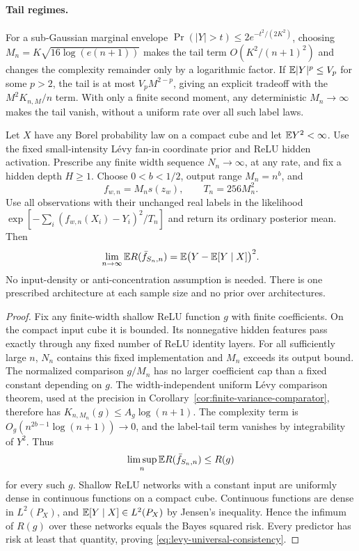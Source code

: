 \paragraph{Tail regimes.}
For a sub-Gaussian marginal envelope
$\Pr(|Y|>t)\le2e^{-t^2/(2K^2)}$, choosing
$M_n=K\sqrt{16\log(e(n+1))}$ makes the tail term
$O(K^2/(n+1)^2)$ and changes the complexity remainder only by a
logarithmic factor. If $\mathbb E|Y|^p\le V_p$ for some $p>2$, the tail is
at most $V_p M^{2-p}$, giving an explicit tradeoff with the
$M^2K_{n,M}/n$ term. With only a finite second moment,
any deterministic $M_n\to\infty$ makes the tail vanish, without a
uniform rate over all such label laws.

\begin{corollary}
\label{cor:levy-universal-consistency}
Let $X$ have any Borel probability law on a compact cube and let
$\mathbb E Y^2<\infty$. Use the fixed small-intensity L\'evy fan-in
coordinate prior and ReLU hidden activation. Prescribe any finite
width sequence $N_n\to\infty$, at any rate, and fix a hidden depth
$H\ge1$. Choose $0<b<1/2$, output range $M_n=n^b$, and
\[
 f_{w,n}=M_n s(z_w),\qquad T_n=256M_n^2.
\]
Use all observations with their unchanged real labels in the
likelihood $\exp[-\sum_i(f_{w,n}(X_i)-Y_i)^2/T_n]$ and return its
ordinary posterior mean. Then
\begin{equation}
 \lim_{n\to\infty}\mathbb E R(\bar f_{S_n,n})
 =\mathbb E\bigl(Y-\mathbb E[Y\mid X]\bigr)^2.
 \label{eq:levy-universal-consistency}
\end{equation}
No input-density or anti-concentration assumption is needed.
There is one prescribed architecture at each sample size and no
prior over architectures.
\end{corollary}
\begin{proof}
Fix any finite-width shallow ReLU function $g$ with finite
coefficients. On the compact input cube it is bounded. Its
nonnegative hidden features pass exactly through any fixed number
of ReLU identity layers. For all sufficiently large $n$, $N_n$
contains this fixed implementation and $M_n$ exceeds its output
bound. The normalized comparison $g/M_n$ has no larger coefficient
cap than a fixed constant depending on $g$.
The width-independent uniform L\'evy comparison theorem, used at the
precision in Corollary~\ref{cor:finite-variance-comparator}, therefore
has $K_{n,M_n}(g)\le A_g\log(n+1)$.
The complexity term is
$O_g(n^{2b-1}\log(n+1))\to0$, and the label-tail term vanishes by
integrability of $Y^2$. Thus
\[
 \limsup_n\mathbb E R(\bar f_{S_n,n})\le R(g)
\]
for every such $g$.
Shallow ReLU networks with a constant input are uniformly dense in
continuous functions on a compact cube. Continuous functions are
dense in $L^2(P_X)$, and $\mathbb E[Y\mid X]\in L^2(P_X)$ by Jensen's
inequality. Hence the infimum of $R(g)$ over these networks equals
the Bayes squared risk. Every predictor has risk at least that
quantity, proving \eqref{eq:levy-universal-consistency}.
\end{proof}

